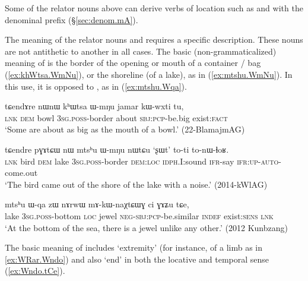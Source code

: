 Some of the relator nouns above can derive verbs of location such as  and  with the denominal prefix  (§\ref{sec:denom.mA}).

The meaning of the relator nouns  and  requires a specific description. These nouns are not antithetic to another in all cases. The basic (non-grammaticalized) meaning of    is the border of the opening or mouth of a container / bag (\ref{ex:khWtsa.WmNu}), or the shoreline (of a lake), as in (\ref{ex:mtshu.WmNu}). In this use, it is opposed to , as in (\ref{ex:mtshu.Wqa}).

\begin{exe}
\ex \label{ex:khWtsa.WmNu}
\gll  tɕendɤre nɯnɯ kʰɯtsa ɯ-mŋu jamar kɯ-wxti tu,\\
\textsc{lnk} \textsc{dem} bowl \textsc{3sg}.\textsc{poss}-border about \textsc{sbj}:\textsc{pcp}-be.big exist:\textsc{fact}\\
\glt  `Some are about as big as the mouth of a bowl.' (22-BlamajmAG)
\end{exe}

\begin{exe}
\ex \label{ex:mtshu.WmNu}
\gll   tɕendre pɣɤtɕɯ nɯ mtsʰu ɯ-mŋu nɯtɕu `ʂɯt' to-ti to-nɯ-ɬoʁ.  \\
\textsc{lnk} bird \textsc{dem} lake \textsc{3sg}.\textsc{poss}-border \textsc{dem}:\textsc{loc} \textsc{idph}.I:sound \textsc{ifr}-say \textsc{ifr}:\textsc{up}-\textsc{auto}-come.out \\
\glt  `The bird came out of the shore of the lake with a noise.' (2014-kWlAG)
\end{exe}

\begin{exe}
\ex \label{ex:mtshu.Wqa}
\gll  mtsʰu ɯ-qa zɯ nɤrwɯ mɤ-kɯ-naχtɕɯɣ ci ɣɤʑu tɕe, \\
lake \textsc{3sg}.\textsc{poss}-bottom \textsc{loc} jewel \textsc{neg}-\textsc{sbj}:\textsc{pcp}-be.similar \textsc{indef} exist:\textsc{sens} \textsc{lnk} \\
\glt `At the bottom of the sea, there is a jewel unlike any other.' (2012 Kunbzang)
\end{exe}

The basic meaning of  includes `extremity' (for instance, of a limb as in \ref{ex:WRar.Wndo}) and also `end' in both the locative and temporal sense (\ref{ex:Wndo.tCe}).

